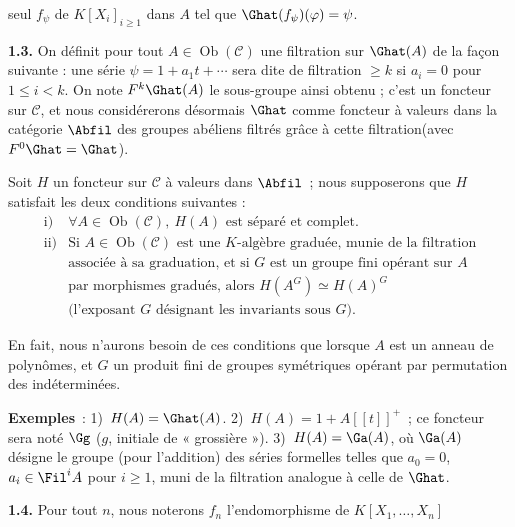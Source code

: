 seul \(f_\psi\) de \(K[X_i]_{i\geq 1}\) dans \(A\) tel que \(\Ghat(f_\psi)(\varphi)=\psi\).

\textbf{1.3.} On définit pour tout \(A\in\operatorname{Ob}(\mathcal C)\) une filtration sur \(\Ghat(A)\) de la façon suivante : une série \(\psi=1+a_1t+\cdots\) sera dite de filtration \(\geq k\) si \(a_i=0\) pour \(1\leq i<k\). On note \(F^k\Ghat(A)\) le sous-groupe ainsi obtenu ; c'est un foncteur sur \(\mathcal C\), et nous considérerons désormais \(\Ghat\) comme foncteur à valeurs dans la catégorie \(\Abfil\) des groupes abéliens filtrés grâce à cette filtration(avec \(F^0\Ghat=\Ghat\)).

Soit \(H\) un foncteur sur \(\mathcal C\) à valeurs dans \(\Abfil\)~; nous supposerons que \(H\) satisfait les deux conditions suivantes :
\[
\begin{array}{ll}
\text{i)} & \forall A\in\operatorname{Ob}(\mathcal C),\ H(A)\text{ est séparé et complet}.\\[0.3em]
\text{ii)} & \text{Si }A\in\operatorname{Ob}(\mathcal C)\text{ est une }K\text{-algèbre graduée, munie de la filtration}\\
& \text{associée à sa graduation, et si }G\text{ est un groupe fini opérant sur }A\\
& \text{par morphismes gradués, alors }H(A^G)\simeq H(A)^G\\
& \text{(l'exposant }G\text{ désignant les invariants sous }G\text{).}
\end{array}
\]

En fait, nous n'aurons besoin de ces conditions que lorsque \(A\) est un anneau de polynômes, et \(G\) un produit fini de groupes symétriques opérant par permutation des indéterminées.

\textbf{Exemples}~: 1)~\(H(A)=\Ghat(A)\). 2)~\(H(A)=1+A[[t]]^+\)~; ce foncteur sera noté \(\Gg\) (\(g\), initiale de « grossière »). 3)~\(H(A)=\Ga(A)\), où \(\Ga(A)\) désigne le groupe (pour l'addition) des séries formelles telles que \(a_0=0\), \(a_i\in\Fil^i A\) pour \(i\geq 1\), muni de la filtration analogue à celle de \(\Ghat\).

\textbf{1.4.} Pour tout \(n\), nous noterons \(f_n\) l'endomorphisme de \(K[X_1,\ldots,X_n]\)

